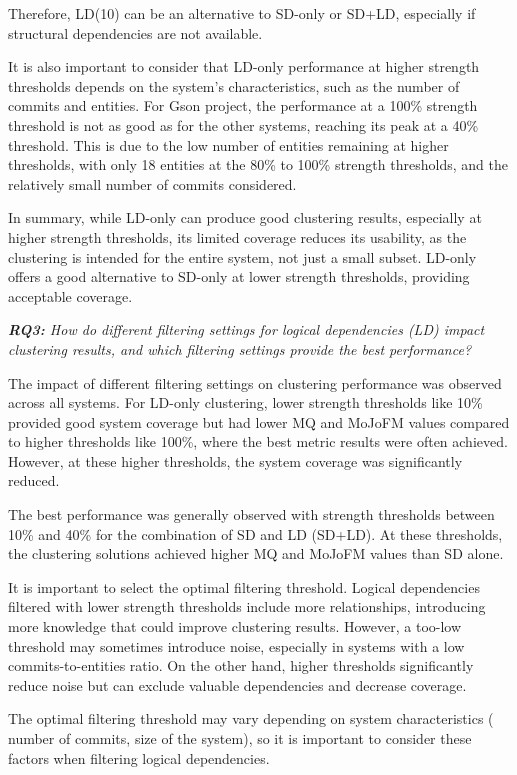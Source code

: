 \documentclass[12pt, a4paper, twoside]{report}
\begin{document}
Therefore, LD(10) can be an alternative to SD-only or SD+LD, especially if structural dependencies are not available.

It is also important to consider that LD-only performance at higher strength thresholds depends on the system's characteristics, such as the number of commits and entities. For Gson project, the performance at a 100\% strength threshold is not as good as for the other systems, reaching its peak at a 40\% threshold. This is due to the low number of entities remaining at higher thresholds, with only 18 entities at the 80\% to 100\% strength thresholds, and the relatively small number of commits considered.

In summary, while LD-only can produce good clustering results, especially at higher strength thresholds, its limited coverage reduces its usability, as the clustering is intended for the entire system, not just a small subset. LD-only offers a good alternative to SD-only at lower strength thresholds, providing acceptable coverage.

\textit{ \textbf{RQ3:} How do different filtering settings for logical dependencies (LD) impact clustering results, and which filtering settings provide the best performance?}

The impact of different filtering settings on clustering performance was observed across all systems. For LD-only clustering, lower strength thresholds like 10\% provided good system coverage but had lower MQ and MoJoFM values compared to higher thresholds like 100\%, where the best metric results were often achieved. However, at these higher thresholds, the system coverage was significantly reduced.

The best performance was generally observed with strength thresholds between 10\% and 40\% for the combination of SD and LD (SD+LD). At these thresholds, the clustering solutions achieved higher MQ and MoJoFM values than SD alone.

It is important to select the optimal filtering threshold. Logical dependencies filtered with lower strength thresholds include more relationships, introducing more knowledge that could improve clustering results. However, a too-low threshold may sometimes introduce noise, especially in systems with a low commits-to-entities ratio. On the other hand, higher thresholds significantly reduce noise but can exclude valuable dependencies and decrease coverage.

The optimal filtering threshold may vary depending on system characteristics ( number of commits, size of the system), so it is important to consider these factors when filtering logical dependencies.
\end{document}
